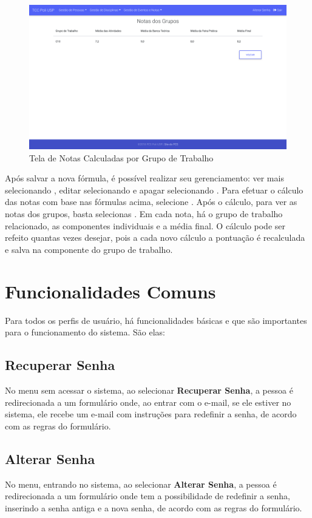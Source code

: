 \begin{figure}[H]
    \centering
    \includegraphics[scale=0.3]{imagens/tela_notas_calculadas.png}
    \caption{Tela de Notas Calculadas por Grupo de Trabalho}
    \label{fig:scores-list}
\end{figure}

Após salvar a nova fórmula, é possível realizar seu gerenciamento: ver mais selecionando \faEye, editar selecionando \faEdit e apagar selecionando \faTrash. Para efetuar o cálculo das notas com base nas fórmulas acima, selecione \faClockO. Após o cálculo, para ver as notas dos grupos, basta selecionas \faListUl. Em cada nota, há o grupo de trabalho relacionado, as componentes individuais e a média final. O cálculo pode ser refeito quantas vezes desejar, pois a cada novo cálculo a pontuação é recalculada e salva na componente do grupo de trabalho.

\section{Funcionalidades Comuns}
Para todos os perfis de usuário, há funcionalidades básicas e que são importantes para o funcionamento do sistema. São elas:

\subsection{Recuperar Senha}
No menu sem acessar o sistema, ao selecionar \textbf{Recuperar Senha}, a pessoa é redirecionada a um formulário onde, ao entrar com o e-mail, se ele estiver no sistema, ele recebe um e-mail com instruções para redefinir a senha, de acordo com as regras do formulário.

\subsection{Alterar Senha}
No menu, entrando no sistema, ao selecionar \textbf{Alterar Senha}, a pessoa é redirecionada a um formulário onde tem a possibilidade de redefinir a senha, inserindo a senha antiga e a nova senha, de acordo com as regras do formulário.